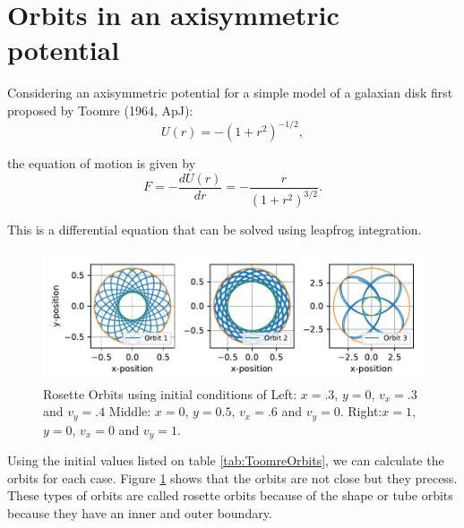 \section{Orbits in an axisymmetric potential}
Considering an axisymmetric potential for a simple model of a galaxian disk first proposed by Toomre (1964, ApJ):
\begin{equation}
    U(r) = -(1+r^2)^{-1/2},
\end{equation}

the equation of motion is given by
\begin{equation}
    F=-\frac{dU(r)}{dr}=-\frac{r}{(1+r^2)^{3/2}}.
\end{equation}

This is a differential equation that can be solved using leapfrog integration.

\begin{figure}[h!]
    \centering
    \includegraphics{CodeAndFigures/ToomrePotentialOrbits.pdf}
    \caption{Rosette Orbits using initial conditions of Left: $x=.3$, $y=0$, $v_x=.3$ and $v_y=.4$ Middle: $x=0$, $y=0.5$, $v_x=.6$ and $v_y=0$. Right:$x=1$, $y=0$, $v_x=0$ and $v_y=1$.}
    \label{fig:ToomreOrbits}
\end{figure}

Using the initial values listed on table \ref{tab:ToomreOrbits}, we can calculate the orbits for each case. Figure \ref{fig:ToomreOrbits} shows that the orbits are not close but they precess. These types of orbits are called rosette orbits because of the shape or tube orbits because they have an inner and outer boundary.

